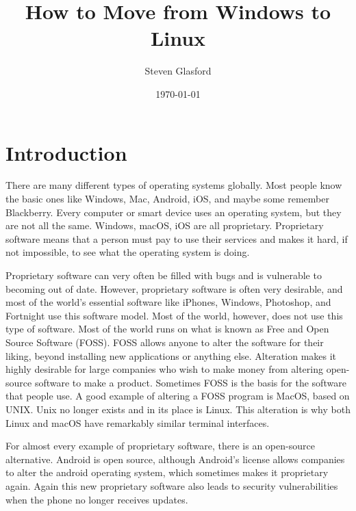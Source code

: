 \documentclass{article}
\title{How to Move from Windows to Linux}
\author{Steven Glasford}
\date{\today}
\begin{document}
\maketitle

\tableofcontents

\section{Introduction}
There are many different types of operating systems globally. Most people know the basic ones like Windows, Mac, Android, iOS, and maybe some remember Blackberry. Every computer or smart device uses an operating system, but they are not all the same. Windows, macOS, iOS are all proprietary. Proprietary software means that a person must pay to use their services and makes it hard, if not impossible, to see what the operating system is doing. 


Proprietary software can very often be filled with bugs and is vulnerable to becoming out of date. However, proprietary software is often very desirable, and most of the world's essential software like iPhones, Windows, Photoshop, and Fortnight use this software model. Most of the world, however, does not use this type of software. Most of the world runs on what is known as Free and Open Source Software (FOSS). FOSS allows anyone to alter the software for their liking, beyond installing new applications or anything else. Alteration makes it highly desirable for large companies who wish to make money from altering open-source software to make a product. Sometimes FOSS is the basis for the software that people use. A good example of altering a FOSS program is MacOS, based on UNIX. Unix no longer exists and in its place is Linux. This alteration is why both Linux and macOS have remarkably similar terminal interfaces.


For almost every example of proprietary software, there is an open-source alternative. Android is open source, although Android's license allows companies to alter the android operating system, which sometimes makes it proprietary again. Again this new proprietary software also leads to security vulnerabilities when the phone no longer receives updates. 
\end{document}
